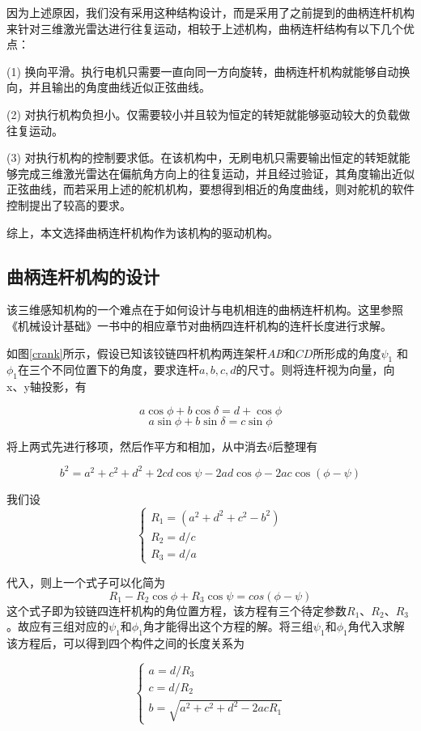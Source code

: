 因为上述原因，我们没有采用这种结构设计，而是采用了之前提到的曲柄连杆机构来针对三维激光雷达进行往复运动，相较于上述机构，曲柄连杆结构有以下几个优点：

(1) 换向平滑。执行电机只需要一直向同一方向旋转，曲柄连杆机构就能够自动换向，并且输出的角度曲线近似正弦曲线。

(2) 对执行机构负担小。仅需要较小并且较为恒定的转矩就能够驱动较大的负载做往复运动。

(3) 对执行机构的控制要求低。在该机构中，无刷电机只需要输出恒定的转矩就能够完成三维激光雷达在偏航角方向上的往复运动，并且经过验证，其角度输出近似正弦曲线，而若采用上述的舵机机构，要想得到相近的角度曲线，则对舵机的软件控制提出了较高的要求。

综上，本文选择曲柄连杆机构作为该机构的驱动机构。

\subsection{曲柄连杆机构的设计}
该三维感知机构的一个难点在于如何设计与电机相连的曲柄连杆机构。这里参照《机械设计基础》一书中的相应章节对曲柄四连杆机构的连杆长度进行求解。

如图\ref{crank}所示，假设已知该铰链四杆机构两连架杆$AB$和$CD$所形成的角度$\psi_1$ 和 $\phi_1$在三个不同位置下的角度，要求连杆$a,b,c,d$的尺寸。则将连杆视为向量，向 x、y轴投影，有

$$a\cos\phi + b\cos\delta = d + \cos\phi$$
$$a\sin\phi + b\sin\delta = c\sin\phi$$

将上两式先进行移项，然后作平方和相加，从中消去$\delta$后整理有

$$b^2 = a^2 + c^2 + d^2 + 2cd\cos\psi -2ad\cos\phi -2ac\cos(\phi - \psi)$$

我们设
$$ 
\begin{cases}
R_1=(a^2 + d^2 + c^2 - b^2) \\
R_2=d/c \\
R_3=d/a
\end{cases}
$$

代入，则上一个式子可以化简为
$$ R_1-R_2\cos\phi + R_3\cos\psi=cos(\phi-\psi)$$
这个式子即为铰链四连杆机构的角位置方程，该方程有三个待定参数$R_1$、$R_2$、$R_3$。故应有三组对应的$\psi_1$和$\phi_1$角才能得出这个方程的解。将三组$\psi_1$和$\phi_1$角代入求解该方程后，可以得到四个构件之间的长度关系为

$$ 
\begin{cases}
a = d / R_3 \\
c = d / R_2 \\
b = \sqrt{a^2 + c^2 + d^2 -2acR_1}
\end{cases}
$$

